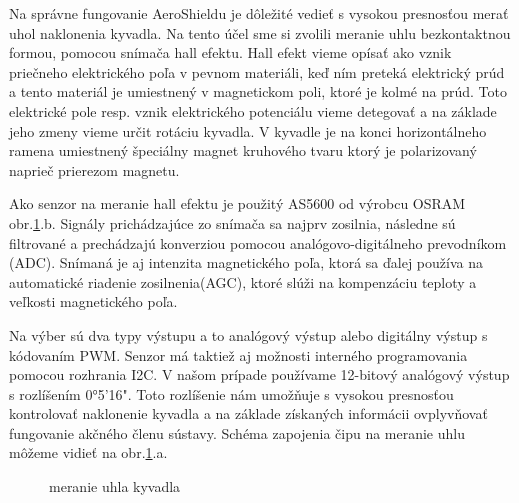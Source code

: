 Na správne fungovanie AeroShieldu je dôležité vedieť s vysokou presnosťou merať uhol naklonenia kyvadla. Na tento účel sme si zvolili meranie uhlu bezkontaktnou formou, pomocou snímača hall efektu. Hall efekt vieme opísať ako vznik priečneho elektrického poľa v pevnom materiáli, keď ním preteká elektrický prúd a tento materiál je umiestnený v magnetickom poli, ktoré je kolmé na prúd\cite{Hall}. Toto elektrické pole resp. vznik elektrického potenciálu vieme detegovať a na základe jeho zmeny vieme určit rotáciu kyvadla. V kyvadle je na konci horizontálneho ramena umiestnený špeciálny magnet kruhového tvaru ktorý je polarizovaný naprieč prierezom magnetu.

Ako senzor na meranie hall efektu je použitý AS5600 od výrobcu OSRAM obr.\ref{OBRAZOK 2.2}.b. Signály prichádzajúce zo snímača sa najprv zosilnia, následne sú filtrované a prechádzajú konverziou pomocou analógovo-digitálneho prevodníkom (ADC). Snímaná je aj intenzita magnetického poľa, ktorá sa ďalej používa na
automatické riadenie zosilnenia(AGC), ktoré slúži na kompenzáciu teploty a veľkosti magnetického poľa.

Na výber sú dva typy výstupu a to analógový výstup alebo digitálny výstup s kódovaním PWM. Senzor má taktiež aj možnosti interného programovania pomocou rozhrania I2C.
V našom prípade používame 12-bitový analógový výstup s rozlíšením 0°5'16". Toto rozlíšenie nám umožňuje s vysokou presnosťou kontrolovať naklonenie kyvadla a na základe získaných informácii ovplyvňovať fungovanie akčného členu sústavy. Schéma zapojenia čipu na meranie uhlu môžeme vidieť na obr.\ref{OBRAZOK 2.2}.a.



\begin{figure}[!tbh]
	\hfill
	\hfill
	\hfill
	\caption{meranie uhla kyvadla}\label{OBRAZOK 2.2}
\end{figure}

